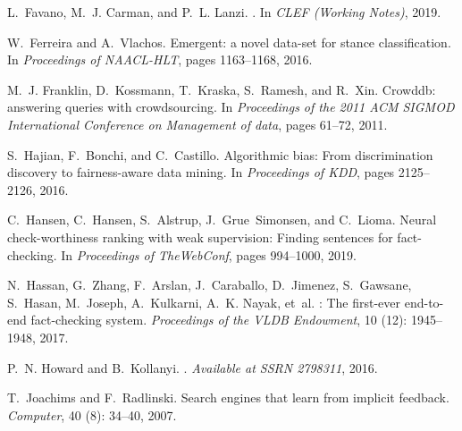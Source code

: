 \documentclass[11pt]{article}
\begin{document}
\begin{thebibliography}{10}
\begin{small}
L.~Favano, M.~J. Carman, and P.~L. Lanzi.
.
\newblock In \emph{CLEF (Working Notes)}, 2019.

W.~Ferreira and A.~Vlachos.
\newblock Emergent: a novel data-set for stance classification.
\newblock In \emph{Proceedings of NAACL-HLT}, pages 1163--1168, 2016.

M.~J. Franklin, D.~Kossmann, T.~Kraska, S.~Ramesh, and R.~Xin.
\newblock Crowddb: answering queries with crowdsourcing.
\newblock In \emph{Proceedings of the 2011 ACM SIGMOD International Conference
	on Management of data}, pages 61--72, 2011.

S.~Hajian, F.~Bonchi, and C.~Castillo.
\newblock Algorithmic bias: From discrimination discovery to fairness-aware
data mining.
\newblock In \emph{Proceedings of KDD}, pages 2125--2126, 2016.

C.~Hansen, C.~Hansen, S.~Alstrup, J.~Grue~Simonsen, and C.~Lioma.
\newblock Neural check-worthiness ranking with weak supervision: Finding
sentences for fact-checking.
\newblock In \emph{Proceedings of TheWebConf}, pages 994--1000, 2019.

N.~Hassan, G.~Zhang, F.~Arslan, J.~Caraballo, D.~Jimenez, S.~Gawsane, S.~Hasan,
M.~Joseph, A.~Kulkarni, A.~K. Nayak, et~al.
: The first-ever end-to-end fact-checking system.
\newblock \emph{Proceedings of the VLDB Endowment}, 10 (12):
1945--1948, 2017.

P.~N. Howard and B.~Kollanyi.
.
\newblock \emph{Available at SSRN 2798311}, 2016.

T.~Joachims and F.~Radlinski.
\newblock Search engines that learn from implicit feedback.
\newblock \emph{Computer}, 40 (8): 34--40, 2007.


\end{small}
\end{thebibliography}
\end{document}
